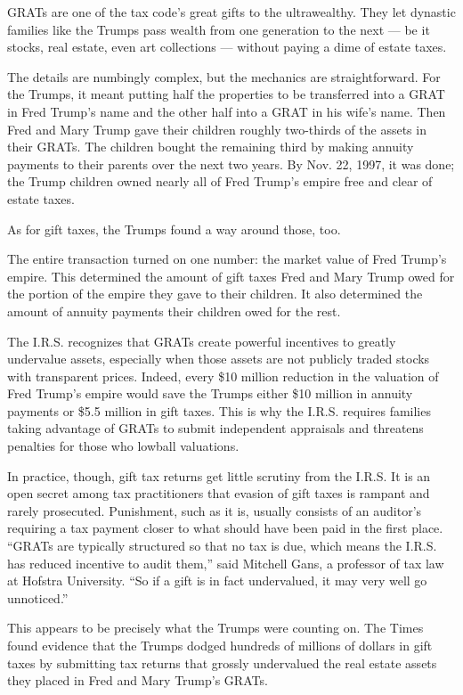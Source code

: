 GRATs are one of the tax code's great gifts to the ultrawealthy. They
let dynastic families like the Trumps pass wealth from one generation to
the next --- be it stocks, real estate, even art collections --- without
paying a dime of estate taxes.

The details are numbingly complex, but the mechanics are
straightforward. For the Trumps, it meant putting half the properties to
be transferred into a GRAT in Fred Trump's name and the other half into
a GRAT in his wife's name. Then Fred and Mary Trump gave their children
roughly two-thirds of the assets in their GRATs. The children bought the
remaining third by making annuity payments to their parents over the
next two years. By Nov. 22, 1997, it was done; the Trump children owned
nearly all of Fred Trump's empire free and clear of estate taxes.

As for gift taxes, the Trumps found a way around those, too.

The entire transaction turned on one number: the market value of Fred
Trump's empire. This determined the amount of gift taxes Fred and Mary
Trump owed for the portion of the empire they gave to their children. It
also determined the amount of annuity payments their children owed for
the rest.

The I.R.S. recognizes that GRATs create powerful incentives to greatly
undervalue assets, especially when those assets are not publicly traded
stocks with transparent prices. Indeed, every \$10 million reduction in
the valuation of Fred Trump's empire would save the Trumps either \$10
million in annuity payments or \$5.5 million in gift taxes. This is why
the I.R.S. requires families taking advantage of GRATs to submit
independent appraisals and threatens penalties for those who lowball
valuations.

In practice, though, gift tax returns get little scrutiny from the
I.R.S. It is an open secret among tax practitioners that evasion of gift
taxes is rampant and rarely prosecuted. Punishment, such as it is,
usually consists of an auditor's requiring a tax payment closer to what
should have been paid in the first place. ``GRATs are typically
structured so that no tax is due, which means the I.R.S. has reduced
incentive to audit them,'' said Mitchell Gans, a professor of tax law at
Hofstra University. ``So if a gift is in fact undervalued, it may very
well go unnoticed.''

This appears to be precisely what the Trumps were counting on. The Times
found evidence that the Trumps dodged hundreds of millions of dollars in
gift taxes by submitting tax returns that grossly undervalued the real
estate assets they placed in Fred and Mary Trump's GRATs.

